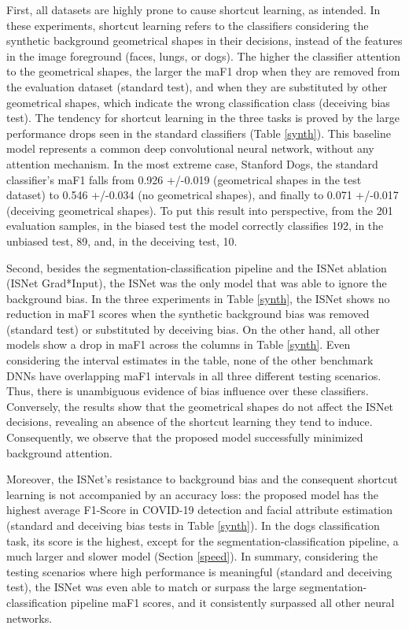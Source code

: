 \documentclass[fleqn,10pt]{wlscirep}
\begin{document}
{First, all datasets are highly prone to cause shortcut learning, as intended. In these experiments, shortcut learning refers to the classifiers considering the synthetic background geometrical shapes in their decisions, instead of the features in the image foreground (faces, lungs, or dogs). The higher the classifier attention to the geometrical shapes, the larger the maF1 drop when they are removed from the evaluation dataset (standard test), and when they are substituted by other geometrical shapes, which indicate the wrong classification class (deceiving bias test). The tendency for shortcut learning in the three tasks is proved by the large performance drops seen in the standard classifiers (Table \ref{synth}). This baseline model represents a common deep convolutional neural network, without any attention mechanism. In the most extreme case, Stanford Dogs, the standard classifier's maF1 falls from 0.926 +/-0.019 (geometrical shapes in the test dataset) to 0.546 +/-0.034 (no geometrical shapes), and finally to 0.071 +/-0.017 (deceiving geometrical shapes). To put this result into perspective, from the 201 evaluation samples, in the biased test the model correctly classifies 192, in the unbiased test, 89, and, in the deceiving test, 10.

Second, besides the segmentation-classification pipeline and the ISNet ablation (ISNet Grad*Input), the ISNet was the only model that was able to ignore the background bias. In the three experiments in Table \ref{synth}, the ISNet shows no reduction in maF1 scores when the synthetic background bias was removed (standard test) or substituted by deceiving bias. On the other hand, all other models show a drop in maF1 across the columns in Table \ref{synth}. Even considering the interval estimates in the table, none of the other benchmark DNNs have overlapping maF1 intervals in all three different testing scenarios. Thus, there is unambiguous evidence of bias influence over these classifiers. Conversely, the results show that the geometrical shapes do not affect the ISNet decisions, revealing an absence of the shortcut learning they tend to induce. Consequently, we observe that the proposed model successfully minimized background attention.

Moreover, the ISNet's resistance to background bias and the consequent shortcut learning is not accompanied by an accuracy loss: the proposed model has the highest average F1-Score in COVID-19 detection and facial attribute estimation (standard and deceiving bias tests in Table \ref{synth}). In the dogs classification task, its score is the highest, except for the segmentation-classification pipeline, a much larger and slower model (Section \ref{speed}). In summary, considering the testing scenarios where high performance is meaningful (standard and deceiving test), the ISNet was even able to match or surpass the large segmentation-classification pipeline maF1 scores, and it consistently surpassed all other neural networks.

}
\end{document}
